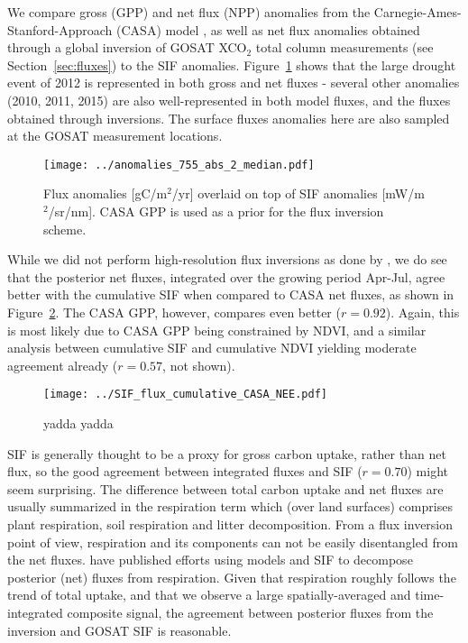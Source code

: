 \documentclass[preprint, a4paper, 10pt, times, 5p]{elsarticle}
\begin{document}
We compare gross (GPP) and net flux (NPP) anomalies from the Carnegie-Ames-Stanford-Approach (CASA) model \citep{potter1993terrestrial}, as well as net flux anomalies obtained through a global inversion of GOSAT XCO$_2$ total column measurements (see Section~\ref{sec:fluxes}) to the SIF anomalies. Figure~\ref{fig:anomalies_3} shows that the large drought event of 2012 is represented in both gross and net fluxes - several other anomalies (2010, 2011, 2015) are also well-represented in both model fluxes, and the fluxes obtained through inversions. The surface fluxes anomalies here are also sampled at the GOSAT measurement locations.

\begin{figure}[htb!]
\centering
\texttt{[image: ../anomalies\_755\_abs\_2\_median.pdf]}
\caption{Flux anomalies [gC/m$^2$/yr] overlaid on top of SIF anomalies [mW/m$^2$/sr/nm]. CASA GPP is used as a prior for the flux inversion scheme.}
\label{fig:anomalies_3}
\end{figure}

While we did not perform high-resolution flux inversions as done by \citet{lauvaux2012constraining}, we do see that the posterior net fluxes, integrated over the growing period Apr-Jul, agree better with the cumulative SIF when compared to CASA net fluxes, as shown in Figure~\ref{fig:SIF_flux_cumulative}. The CASA GPP, however, compares even better ($r = 0.92$). Again, this is most likely due to CASA GPP being constrained by NDVI, and a similar analysis between cumulative SIF and cumulative NDVI yielding moderate agreement already ($r = 0.57$, not shown).

\begin{figure}[htb!]
\centering
\texttt{[image: ../SIF\_flux\_cumulative\_CASA\_NEE.pdf]}
\caption{yadda yadda}
\label{fig:SIF_flux_cumulative}
\end{figure}

SIF is generally thought to be a proxy for gross carbon uptake, rather than net flux, so the good agreement between integrated fluxes and SIF ($r = 0.70$) might seem surprising. The difference between total carbon uptake and net fluxes are usually summarized in the respiration term which (over land surfaces) comprises plant respiration, soil respiration and litter decomposition. From a flux inversion point of view, respiration and its components can not be easily disentangled from the net fluxes. \citet{byrne2018evaluating} have published efforts using models and SIF to decompose posterior (net) fluxes from respiration. Given that respiration roughly follows the trend of total uptake, and that we observe a large spatially-averaged and time-integrated composite signal, the agreement between posterior fluxes from the inversion and GOSAT SIF is reasonable.
\end{document}
